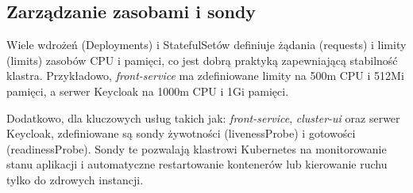\subsection{Zarządzanie zasobami i sondy}
\label{sub:zasoby_sondy}
Wiele wdrożeń (Deployments) i StatefulSetów definiuje żądania (requests) i limity (limits) zasobów CPU i pamięci, co jest dobrą praktyką zapewniającą stabilność klastra. Przykładowo, \textit{front-service} ma zdefiniowane limity na 500m CPU i 512Mi pamięci, a serwer Keycloak na 1000m CPU i 1Gi pamięci.

Dodatkowo, dla kluczowych usług takich jak: \textit{front-service}, \textit{cluster-ui} oraz serwer Keycloak, zdefiniowane są sondy żywotności (livenessProbe) i gotowości (readinessProbe). Sondy te pozwalają klastrowi Kubernetes na monitorowanie stanu aplikacji i automatyczne restartowanie kontenerów lub kierowanie ruchu tylko do zdrowych instancji.
